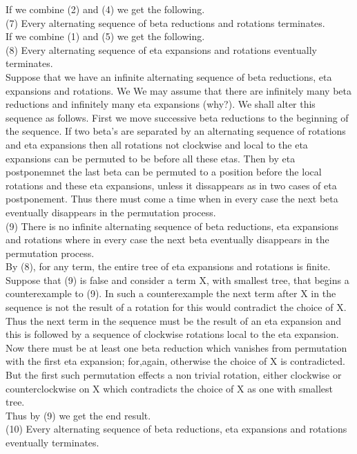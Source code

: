 If we combine (2) and (4) we get the following.\\

(7) Every alternating sequence of beta reductions and rotations terminates.\\

If we combine (1) and (5) we get the following.\\

(8) Every alternating sequence of eta expansions and rotations eventually terminates.\\

Suppose that we have an infinite alternating sequence of beta reductions, eta expansions and rotations. We We may assume that there are infinitely many beta reductions and infinitely many eta expansions (why?). We shall alter this sequence as follows. First we move successive beta reductions to the beginning of  the sequence. If two beta's are separated by an alternating sequence of rotations and eta expansions then all rotations not clockwise and local to the eta expansions can be permuted to be before all these etas. Then by eta postponemnet the last beta can be permuted to a position before the local rotations and these eta expansions, unless it dissappears as in two cases of eta postponement. Thus there must come a time when in every case the next beta eventually disappears in the permutation process.\\

(9) There is no infinite alternating sequence of beta reductions, eta expansions and rotations where in every case the next beta eventually disappears in the permutation process.\\

By (8), for any term, the entire tree of eta expansions and rotations is finite. Suppose that (9) is false and consider a term X, with smallest tree, that begins a counterexample to (9). In such a counterexample the next term after X in the sequence is not the result of a rotation for this would contradict the choice of X. Thus the next term in the sequence must be the result of an eta expansion and this is followed by a sequence of clockwise rotations local to the eta expansion. Now there must be at least one beta reduction which vanishes from permutation with the first eta expansion; for,again, otherwise the choice of X is contradicted. But the first such permutation effects a non trivial rotation, either clockwise or counterclockwise on X which contradicts the choice of X as one with smallest tree.\\


Thus by (9) we get the end result.\\

(10) Every alternating sequence of beta reductions, eta expansions and rotations eventually terminates.